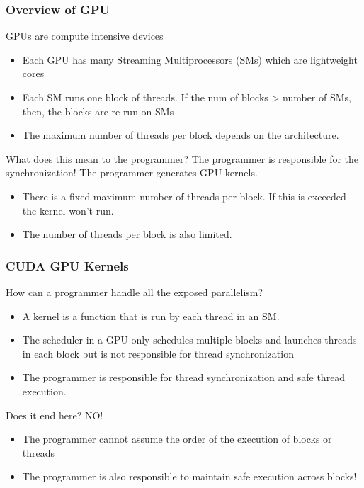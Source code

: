 \documentclass[mathserif]{beamer}
\begin{document}
\begin{frame}                                                                                                                                                                          
\frametitle{Overview of GPU}
GPUs are compute intensive devices
\begin{itemize}
\item Each GPU has many Streaming Multiprocessors (SMs) which are lightweight cores  
\item Each SM runs one block of threads. If the num of blocks > number of SMs, then, the blocks are re run on SMs
\item The maximum number of threads per block depends on the architecture.  
\end{itemize}
What does this mean to the programmer? 
The programmer is responsible for the synchronization!
The programmer generates GPU kernels. 
\begin{itemize}
\item There is a fixed maximum number of threads per block. If this is exceeded the kernel won't run. 
\item The number of threads per block is also limited.  
\end{itemize}
\end{frame}              

\begin{frame}                                                                                                                                                                          
\frametitle{CUDA GPU Kernels}
How can a programmer handle all the exposed parallelism?
\begin{itemize}
\item A kernel is a function that is run by each thread in an SM.  
\item The scheduler in a GPU only schedules multiple blocks and launches threads in each block but is not responsible for thread synchronization 
\item The programmer is responsible for thread synchronization and safe thread execution.  
\end{itemize}
Does it end here? NO!
\begin{itemize}
\item The programmer cannot assume the order of the execution of blocks or threads 
\item The programmer is also responsible to maintain safe execution across blocks! 
\end{itemize} 
\end{frame}              
\end{document}
